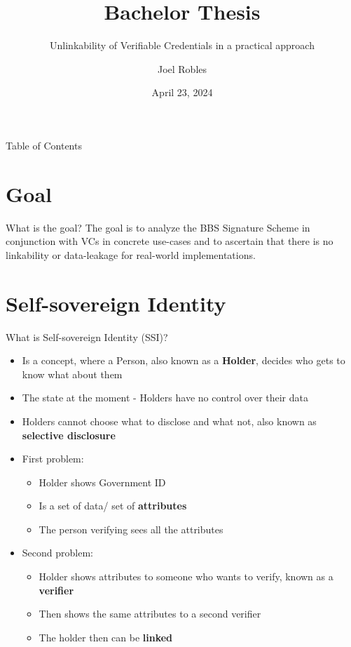\documentclass[
	english,%
	authorontitle=true,
	]{bfhbeamer}
\title{Bachelor Thesis}
\subtitle{Unlinkability of Verifiable Credentials in a practical approach}
\author[J. Robles]{Joel Robles}
\institute{TI}
\date{April 23, 2024}
\begin{document}
\maketitle

\begin{frame}{Table of Contents}
    \tableofcontents
\end{frame}

\section{Goal}

\begin{frame}{What is the goal?}
    The goal is to analyze the BBS Signature Scheme in conjunction with VCs in concrete use-cases and to ascertain that there is no linkability or data-leakage for real-world implementations.
\end{frame}

\section{Self-sovereign Identity}

\begin{frame}{What is Self-sovereign Identity (SSI)?}
    \begin{itemize}
        \item Is a concept, where a Person, also known as a \textbf{Holder}, decides who gets to know what about them
        \item The state at the moment - Holders have no control over their data
        \item Holders cannot choose what to disclose and what not, also known as \textbf{selective disclosure}
        \item First problem: 
        \begin{itemize}
            \item Holder shows Government ID
            \item Is a set of data/ set of \textbf{attributes}
            \item The person verifying sees all the attributes
        \end{itemize}
        \item Second problem:
        \begin{itemize}
            \item Holder shows attributes to someone who wants to verify, known as a \textbf{verifier}
            \item Then shows the same attributes to a second verifier
            \item The holder then can be \textbf{linked}
        \end{itemize}
    \end{itemize}
\end{frame}
\end{document}
